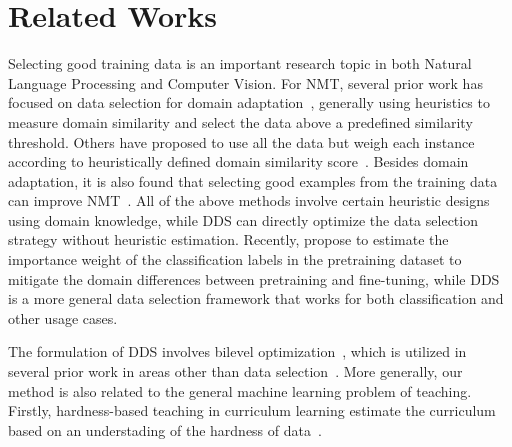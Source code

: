 \section{\label{sec:related_work}Related Works}

Selecting good training data is an important research topic in both Natural Language Processing and Computer Vision. For NMT, several prior work has focused on data selection for domain adaptation~\citep{moore2010intelligent,axelrod2011domain}, generally using heuristics to measure domain similarity and select the data above a predefined similarity threshold. Others have proposed to use all the data but weigh each instance according to heuristically defined domain similarity score~\citep{jiang-zhai-2007-instance,foster-etal-2010-discriminative,wang-etal-2017-instance}. Besides domain adaptation, it is also found that selecting good examples from the training data can improve NMT~\citep{vyas-etal-2018-identifying,pham-etal-2018-fixing}. All of the above methods involve certain heuristic designs using domain knowledge, while DDS can directly optimize the data selection strategy without heuristic estimation. Recently, \cite{domain_adapt_transfer} propose to estimate the importance weight of the classification labels in the pretraining dataset to mitigate the domain differences between pretraining and fine-tuning, while DDS is a more general data selection framework that works for both classification and other usage cases.  

The formulation of DDS involves bilevel optimization~\citep{bilevel_optim,hier_optim}, which is utilized in several prior work in areas other than data selection~\citep{darts,hyper_grad,finn2017model}. More generally, our method is also related to the general machine learning problem of teaching. Firstly, hardness-based teaching in curriculum learning estimate the curriculum based on an understading of the hardness of data~\citep{cl_bengio,zhang2016boosting,zhang2018empirical,platanios19naacl,baysian_curriculum}.  



